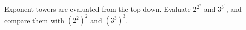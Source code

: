 Exponent towers are evaluated from the top down. Evaluate $2^{2^2}$ and $3^{3^3}$, and compare them with $\left(2^2\right)^2$ and $\left(3^3\right)^3$.
